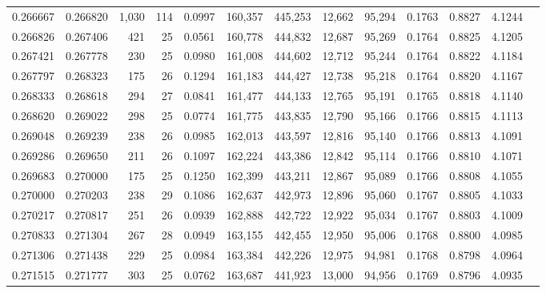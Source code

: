 \begin{tabular}{rrrrrrrrrrrrr}
0.266667 & 0.266820 &  1,030 &   114 &                                     0.0997 & 160,357 & 445,253 &  12,662 &  95,294 & 0.1763 & 0.8827 & 4.1244 \\
0.266826 & 0.267406 &    421 &    25 &                                     0.0561 & 160,778 & 444,832 &  12,687 &  95,269 & 0.1764 & 0.8825 & 4.1205 \\
0.267421 & 0.267778 &    230 &    25 &                                     0.0980 & 161,008 & 444,602 &  12,712 &  95,244 & 0.1764 & 0.8822 & 4.1184 \\
0.267797 & 0.268323 &    175 &    26 &                                     0.1294 & 161,183 & 444,427 &  12,738 &  95,218 & 0.1764 & 0.8820 & 4.1167 \\
0.268333 & 0.268618 &    294 &    27 &                                     0.0841 & 161,477 & 444,133 &  12,765 &  95,191 & 0.1765 & 0.8818 & 4.1140 \\
0.268620 & 0.269022 &    298 &    25 &                                     0.0774 & 161,775 & 443,835 &  12,790 &  95,166 & 0.1766 & 0.8815 & 4.1113 \\
0.269048 & 0.269239 &    238 &    26 &                                     0.0985 & 162,013 & 443,597 &  12,816 &  95,140 & 0.1766 & 0.8813 & 4.1091 \\
0.269286 & 0.269650 &    211 &    26 &                                     0.1097 & 162,224 & 443,386 &  12,842 &  95,114 & 0.1766 & 0.8810 & 4.1071 \\
0.269683 & 0.270000 &    175 &    25 &                                     0.1250 & 162,399 & 443,211 &  12,867 &  95,089 & 0.1766 & 0.8808 & 4.1055 \\
0.270000 & 0.270203 &    238 &    29 &                                     0.1086 & 162,637 & 442,973 &  12,896 &  95,060 & 0.1767 & 0.8805 & 4.1033 \\
0.270217 & 0.270817 &    251 &    26 &                                     0.0939 & 162,888 & 442,722 &  12,922 &  95,034 & 0.1767 & 0.8803 & 4.1009 \\
0.270833 & 0.271304 &    267 &    28 &                                     0.0949 & 163,155 & 442,455 &  12,950 &  95,006 & 0.1768 & 0.8800 & 4.0985 \\
0.271306 & 0.271438 &    229 &    25 &                                     0.0984 & 163,384 & 442,226 &  12,975 &  94,981 & 0.1768 & 0.8798 & 4.0964 \\
0.271515 & 0.271777 &    303 &    25 &                                     0.0762 & 163,687 & 441,923 &  13,000 &  94,956 & 0.1769 & 0.8796 & 4.0935 \\

\end{tabular}
